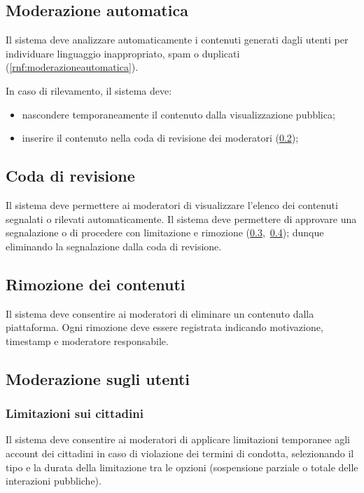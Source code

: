 \begin{rfscope}
\subsection{Moderazione automatica} \label{rf:moderazioneautomatica}
Il sistema deve analizzare automaticamente i contenuti generati dagli utenti per individuare linguaggio inappropriato, spam o duplicati (\ref{rnf:moderazioneautomatica}).

In caso di rilevamento, il sistema deve:
\begin{itemize}
    \item nascondere temporaneamente il contenuto dalla visualizzazione pubblica;
    \item inserire il contenuto nella coda di revisione dei moderatori (\ref{rf:validazionecontenuti});
\end{itemize}

\subsection{Coda di revisione} \label{rf:validazionecontenuti}
Il sistema deve permettere ai moderatori di visualizzare l’elenco dei contenuti segnalati o rilevati automaticamente. Il sistema deve permettere di approvare una segnalazione o di procedere con limitazione e rimozione (\ref{rf:rimozionecontenuti},~\ref{rf:moderazioneutenti}); dunque eliminando la segnalazione dalla coda di revisione.

\subsection{Rimozione dei contenuti} \label{rf:rimozionecontenuti}
Il sistema deve consentire ai moderatori di eliminare un contenuto dalla piattaforma.
Ogni rimozione deve essere registrata indicando motivazione, timestamp e moderatore responsabile.

\subsection{Moderazione sugli utenti} \label{rf:moderazioneutenti}

\subsubsection{Limitazioni sui cittadini} \label{rf:moderazionecittadini}
Il sistema deve consentire ai moderatori di applicare limitazioni temporanee agli account dei cittadini in caso di violazione dei termini di condotta, selezionando il tipo e la durata della limitazione tra le opzioni (sospensione parziale o totale delle interazioni pubbliche).


\end{rfscope}
